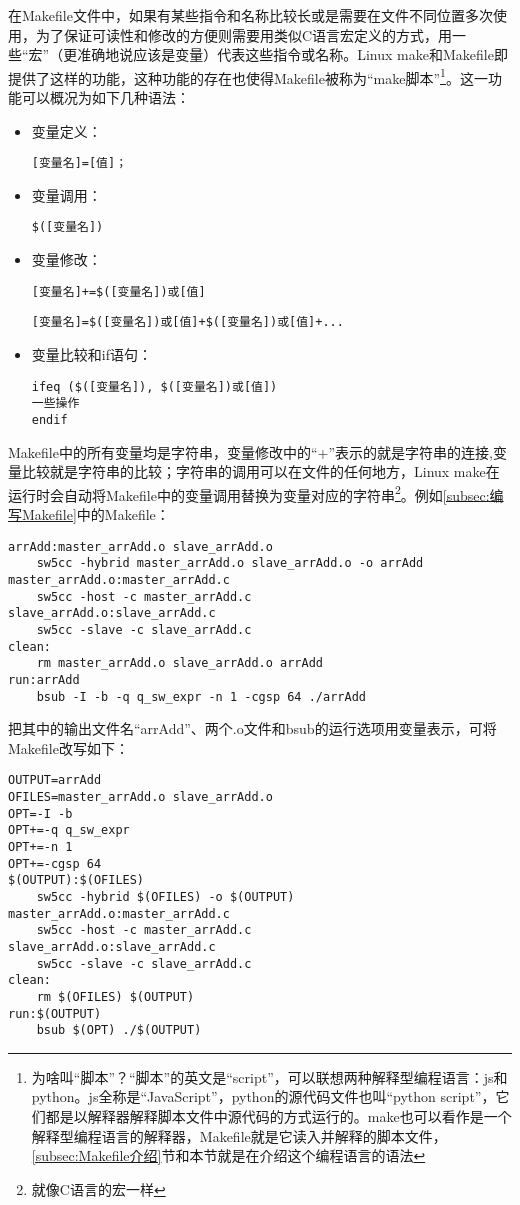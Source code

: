 在Makefile文件中，如果有某些指令和名称比较长或是需要在文件不同位置多次使用，为了保证可读性和修改的方便则需要用类似C语言宏定义的方式，用一些“宏”（更准确地说应该是变量）代表这些指令或名称。Linux make和Makefile即提供了这样的功能，这种功能的存在也使得Makefile被称为“make脚本”\footnote{为啥叫“脚本”？“脚本”的英文是“script”，可以联想两种解释型编程语言：js和python。js全称是“JavaScript”，python的源代码文件也叫“python script”，它们都是以解释器解释脚本文件中源代码的方式运行的。make也可以看作是一个解释型编程语言的解释器，Makefile就是它读入并解释的脚本文件，\ref{subsec:Makefile介绍}节和本节就是在介绍这个编程语言的语法}。这一功能可以概况为如下几种语法：
\begin{itemize}
    \item 变量定义：
    \begin{lstlisting}
[变量名]=[值]；
    \end{lstlisting}
    \item 变量调用：
    \begin{lstlisting}
$([变量名])
    \end{lstlisting}
    \item 变量修改：
    \begin{lstlisting}
[变量名]+=$([变量名])或[值]
    \end{lstlisting}
    \begin{lstlisting}
[变量名]=$([变量名])或[值]+$([变量名])或[值]+...
    \end{lstlisting}
    \item 变量比较和if语句：
    \begin{lstlisting}
ifeq ($([变量名]), $([变量名])或[值])
一些操作
endif
    \end{lstlisting}
\end{itemize}

Makefile中的所有变量均是字符串，变量修改中的“+”表示的就是字符串的连接,变量比较就是字符串的比较；字符串的调用可以在文件的任何地方，Linux make在运行时会自动将Makefile中的变量调用替换为变量对应的字符串\footnote{就像C语言的宏一样}。例如\ref{subsec:编写Makefile}中的Makefile：
\begin{lstlisting}
arrAdd:master_arrAdd.o slave_arrAdd.o
    sw5cc -hybrid master_arrAdd.o slave_arrAdd.o -o arrAdd
master_arrAdd.o:master_arrAdd.c
    sw5cc -host -c master_arrAdd.c
slave_arrAdd.o:slave_arrAdd.c
    sw5cc -slave -c slave_arrAdd.c
clean:
    rm master_arrAdd.o slave_arrAdd.o arrAdd
run:arrAdd
    bsub -I -b -q q_sw_expr -n 1 -cgsp 64 ./arrAdd
\end{lstlisting}
把其中的输出文件名“arrAdd”、两个.o文件和bsub的运行选项用变量表示，可将Makefile改写如下：
\begin{lstlisting}
OUTPUT=arrAdd
OFILES=master_arrAdd.o slave_arrAdd.o
OPT=-I -b
OPT+=-q q_sw_expr
OPT+=-n 1
OPT+=-cgsp 64
$(OUTPUT):$(OFILES)
    sw5cc -hybrid $(OFILES) -o $(OUTPUT)
master_arrAdd.o:master_arrAdd.c
    sw5cc -host -c master_arrAdd.c
slave_arrAdd.o:slave_arrAdd.c
    sw5cc -slave -c slave_arrAdd.c
clean:
    rm $(OFILES) $(OUTPUT)
run:$(OUTPUT)
    bsub $(OPT) ./$(OUTPUT)
\end{lstlisting}

